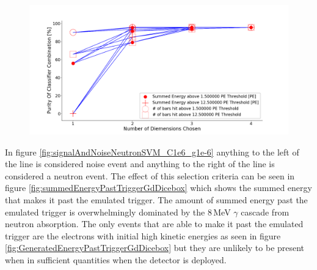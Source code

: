 \begin{figure}[htbp]
\centering
\includegraphics[width=\linewidth]{Chapter4/Figs/Raster/purNeutronSVMC1e6_g1e-6.png}
\label{fig:purNeutronSVMC1e6_g1e-6}
\end{figure}

In figure \ref{fig:signalAndNoiseNeutronSVM_C1e6_g1e-6} anything to the left of the line is considered noise event and anything to the right of the line is considered a neutron event. The effect of this selection criteria can be seen in figure \ref{fig:summedEnergyPastTriggerGdDicebox} which shows the summed energy that makes it past the emulated trigger. The amount of summed energy past the emulated trigger is overwhelmingly dominated by the 8\,MeV $\gamma$ cascade from neutron absorption. The only events that are able to make it past the emulated trigger are the electrons with initial high kinetic energies as seen in figure \ref{fig:GeneratedEnergyPastTriggerGdDicebox} but they are unlikely to be present when in sufficient quantities when the detector is deployed. 

